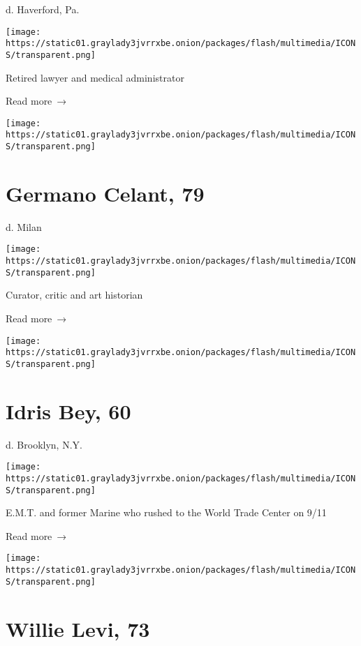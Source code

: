 d. Haverford, Pa.

\texttt{[image: https://static01.graylady3jvrrxbe.onion/packages/flash/multimedia/ICONS/transparent.png]}

Retired lawyer and medical administrator

 Read more~→

\href{https://www.nytimes3xbfgragh.onion/2020/04/30/arts/germano-celant-curator-behind-italys-arte-povera-dies-at-79.html}{}

\texttt{[image: https://static01.graylady3jvrrxbe.onion/packages/flash/multimedia/ICONS/transparent.png]}

\hypertarget{germano-celant-79}{%
\section{Germano Celant, 79}\label{germano-celant-79}}

d. Milan

\texttt{[image: https://static01.graylady3jvrrxbe.onion/packages/flash/multimedia/ICONS/transparent.png]}

Curator, critic and art historian

 Read more~→

\href{https://www.nytimes3xbfgragh.onion/2020/04/30/obituaries/idris-bey-dead-coronavirus.html}{}

\texttt{[image: https://static01.graylady3jvrrxbe.onion/packages/flash/multimedia/ICONS/transparent.png]}

\hypertarget{idris-bey-60}{%
\section{Idris Bey, 60}\label{idris-bey-60}}

d. Brooklyn, N.Y.

\texttt{[image: https://static01.graylady3jvrrxbe.onion/packages/flash/multimedia/ICONS/transparent.png]}

E.M.T. and former Marine who rushed to the World Trade Center on 9/11

 Read more~→

\href{https://www.nytimes3xbfgragh.onion/2020/04/30/us/willie-levi-73-dies-he-escaped-a-life-of-servitude.html}{}

\texttt{[image: https://static01.graylady3jvrrxbe.onion/packages/flash/multimedia/ICONS/transparent.png]}

\hypertarget{willie-levi-73}{%
\section{Willie Levi, 73}\label{willie-levi-73}}

